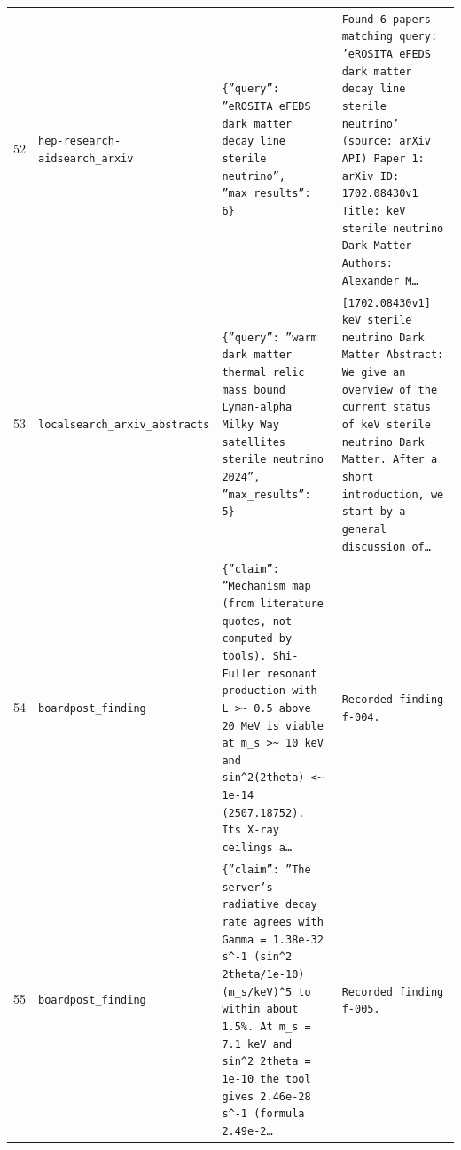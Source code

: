 \documentclass[11pt,a4paper]{article}
\begin{document}
\begin{longtable}{@{}p{}p{}p{}p{}@{}}
52 & \texttt{hep-research-aid}\newline\texttt{search\_\allowbreak{}arxiv} & \texttt{\{''query'':\allowbreak{} ''eROSITA eFEDS dark matter decay line sterile neutrino'',\allowbreak{} ''max\_\allowbreak{}results'':\allowbreak{} 6\}\allowbreak{}} & \texttt{Found 6 papers matching query:\allowbreak{} 'eROSITA eFEDS dark matter decay line sterile neutrino' (source:\allowbreak{} arXiv API)\allowbreak{}  Paper 1:\allowbreak{} arXiv ID:\allowbreak{} 1702.08430v1 Title:\allowbreak{} keV sterile neutrino Dark Matter Authors:\allowbreak{} Alexander M\ldots{}\allowbreak{}} \\
53 & \texttt{local}\newline\texttt{search\_\allowbreak{}arxiv\_\allowbreak{}abstracts} & \texttt{\{''query'':\allowbreak{} ''warm dark matter thermal relic mass bound Lyman-alpha Milky Way satellites sterile neutrino 2024'',\allowbreak{} ''max\_\allowbreak{}results'':\allowbreak{} 5\}\allowbreak{}} & \texttt{[1702.08430v1]\allowbreak{} keV sterile neutrino Dark Matter Abstract:\allowbreak{} We give an overview of the current status of keV sterile neutrino Dark Matter. After a short introduction,\allowbreak{} we start by a general discussion of\ldots{}\allowbreak{}} \\
54 & \texttt{board}\newline\texttt{post\_\allowbreak{}finding} & \texttt{\{''claim'':\allowbreak{} ''Mechanism map (from literature quotes,\allowbreak{} not computed by tools)\allowbreak{}. Shi-Fuller resonant production with L \textgreater{}\allowbreak{}\textasciitilde{}\allowbreak{} 0.5 above 20 MeV is viable at m\_\allowbreak{}s \textgreater{}\allowbreak{}\textasciitilde{}\allowbreak{} 10 keV and sin\textasciicircum{}\allowbreak{}2(2theta)\allowbreak{} \textless{}\allowbreak{}\textasciitilde{}\allowbreak{} 1e-14 (2507.18752)\allowbreak{}. Its X-ray ceilings a\ldots{}\allowbreak{}} & \texttt{Recorded finding f-004.} \\
55 & \texttt{board}\newline\texttt{post\_\allowbreak{}finding} & \texttt{\{''claim'':\allowbreak{} ''The server's radiative decay rate agrees with Gamma =\allowbreak{} 1.38e-32 s\textasciicircum{}\allowbreak{}-1 (sin\textasciicircum{}\allowbreak{}2 2theta/\allowbreak{}1e-10)\allowbreak{}(m\_\allowbreak{}s/\allowbreak{}keV)\allowbreak{}\textasciicircum{}\allowbreak{}5 to within about 1.5\%. At m\_\allowbreak{}s =\allowbreak{} 7.1 keV and sin\textasciicircum{}\allowbreak{}2 2theta =\allowbreak{} 1e-10 the tool gives 2.46e-28 s\textasciicircum{}\allowbreak{}-1 (formula 2.49e-2\ldots{}\allowbreak{}} & \texttt{Recorded finding f-005.} \\

\end{longtable}
\end{document}

